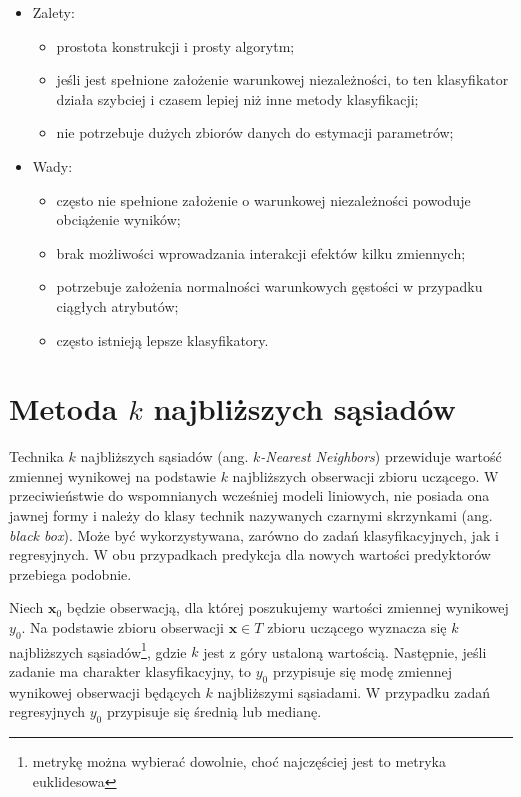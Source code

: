\documentclass[]{book}
\providecommand{\tightlist}{%
  \setlength{\itemsep}{0pt}\setlength{\parskip}{0pt}}
\let\rmarkdownfootnote\footnote%
\def\footnote{\protect\rmarkdownfootnote}
\theoremstyle{plain}
\theoremstyle{definition}
\theoremstyle{definition}
\theoremstyle{definition}
\theoremstyle{definition}
\theoremstyle{remark}
\begin{document}
\begin{itemize}
\tightlist
\item
  Zalety:

  \begin{itemize}
  \tightlist
  \item
    prostota konstrukcji i prosty algorytm;
  \item
    jeśli jest spełnione założenie warunkowej niezależności, to ten klasyfikator działa szybciej i czasem lepiej niż inne metody klasyfikacji;
  \item
    nie potrzebuje dużych zbiorów danych do estymacji parametrów;
  \end{itemize}
\item
  Wady:

  \begin{itemize}
  \tightlist
  \item
    często nie spełnione założenie o warunkowej niezależności powoduje obciążenie wyników;
  \item
    brak możliwości wprowadzania interakcji efektów kilku zmiennych;
  \item
    potrzebuje założenia normalności warunkowych gęstości w przypadku ciągłych atrybutów;
  \item
    często istnieją lepsze klasyfikatory.
  \end{itemize}
\end{itemize}

\hypertarget{metoda-k-najblizszych-sasiadow}{%
\chapter{\texorpdfstring{Metoda \(k\) najbliższych sąsiadów}{Metoda k najbliższych sąsiadów}}\label{metoda-k-najblizszych-sasiadow}}

Technika \(k\) najbliższych sąsiadów (ang. \emph{\(k\)-Nearest Neighbors}) przewiduje wartość zmiennej wynikowej na podstawie \(k\) najbliższych obserwacji zbioru uczącego. W przeciwieństwie do wspomnianych wcześniej modeli liniowych, nie posiada ona jawnej formy i należy do klasy technik nazywanych czarnymi skrzynkami (ang. \emph{black box}). Może być wykorzystywana, zarówno do zadań klasyfikacyjnych, jak i regresyjnych. W obu przypadkach predykcja dla nowych wartości predyktorów przebiega podobnie.

Niech \(\boldsymbol x_0\) będzie obserwacją, dla której poszukujemy wartości zmiennej wynikowej \(y_0\). Na podstawie zbioru obserwacji \(\boldsymbol x\in T\) zbioru uczącego wyznacza się \(k\) najbliższych sąsiadów\footnote{metrykę można wybierać dowolnie, choć najczęściej jest to metryka euklidesowa}, gdzie \(k\) jest z góry ustaloną wartością. Następnie, jeśli zadanie ma charakter klasyfikacyjny, to \(y_0\) przypisuje się modę zmiennej wynikowej obserwacji będących \(k\) najbliższymi sąsiadami. W przypadku zadań regresyjnych \(y_0\) przypisuje się średnią lub medianę.
\end{document}
